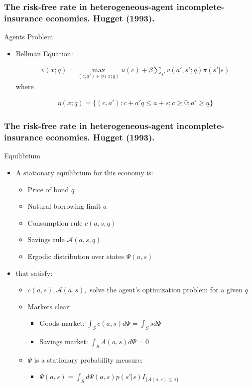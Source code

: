 \documentclass{beamer}
\begin{document}
\frame
{
  \frametitle{  The risk-free rate in heterogeneous-agent incomplete-insurance economies. Hugget (1993).}
  Agents Problem 
\begin{itemize}
	\item Bellman Equation: 

	\begin{eqnarray*}
		v(x;q) = \max_{(c,a')\in \eta(x;q)} u(c) + \beta \sum_{s'} v(a',s';q) \pi(s' \vert s)
	\end{eqnarray*}
where

	\begin{eqnarray*}
		\eta(x;q) = \{(c,a'): c+a'q \le a+s; c \ge 0; a' \ge \underline{a} \}
	\end{eqnarray*}

\end{itemize}
}


\frame
{
  \frametitle{  The risk-free rate in heterogeneous-agent incomplete-insurance economies. Hugget (1993).}
  Equilibrium
\begin{itemize}
	\item A stationary equilibrium for this economy is:
	\begin{itemize}
		\item Price of bond $q$
		\item Natural borrowing limit $\underline{a}$
		\item Consumption rule $c(a,s,q)$
		\item Savings rule $\mathcal{A}(a,s,q)$
		\item Ergodic distribution over states $\Psi(a,s)$
	\end{itemize}
	\item that satisfy:
	\begin{itemize}
		\item $c(a,s), \mathcal{A}(a,s),$ solve the agent's optimization problem for a given $q$
		\item Markets clear: 
		\begin{itemize}
			\item Goods market: $\int_S c(a,s) d\Psi = \int_S s d\Psi$ 
			\item Savings market: $\int_S A(a,s) d\Psi =0$
		\end{itemize}
		\item $\Psi$ is a stationary  probability measure: 
		\begin{itemize}
		\item $\Psi(a,s) = \int_S d\Psi(a,s) p(s' \vert s) I_{\{A(a,s) \le a \}}$
		\end{itemize}
	\end{itemize}
\end{itemize}
}
\end{document}
